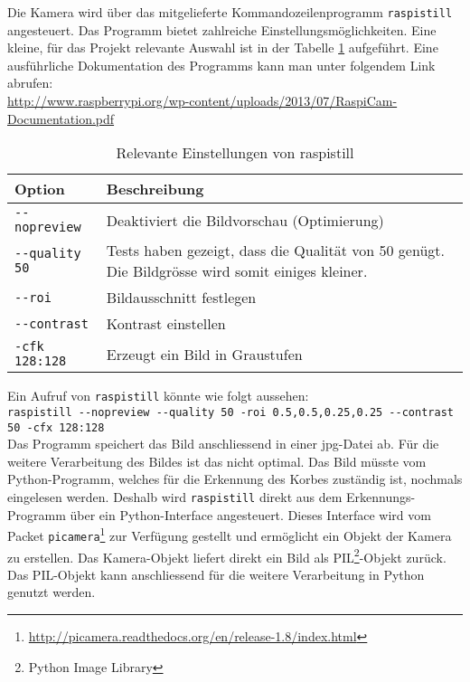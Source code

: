 Die Kamera wird über das mitgelieferte Kommandozeilenprogramm \verb|raspistill| angesteuert. Das Programm bietet zahlreiche Einstellungsmöglichkeiten. Eine kleine, für das Projekt relevante Auswahl ist in der Tabelle \ref{tab:raspistill} aufgeführt. Eine ausführliche Dokumentation des Programms kann man unter folgendem Link abrufen: \\

\href{http://www.raspberrypi.org/wp-content/uploads/2013/07/RaspiCam-Documentation.pdf}{http://www.raspberrypi.org/wp-content/uploads/2013/07/RaspiCam-Documentation.pdf} \\

\begin{table}[h!]
	\renewcommand{\arraystretch}{1.5}
	\begin{tabular}{|l|p{14cm}|}
		\hline Option & Beschreibung \\ 
		\hline \verb|--nopreview| & Deaktiviert die Bildvorschau (Optimierung) \\ 
		\hline  \verb|--quality 50| & Tests haben gezeigt, dass die Qualität von 50 genügt. Die Bildgrösse wird somit einiges kleiner. \\ 
		\hline  \verb|--roi| & Bildausschnitt festlegen \\ 
		\hline  \verb|--contrast| & Kontrast einstellen \\ 
		\hline  \verb|-cfk 128:128| & Erzeugt ein Bild in Graustufen \\ 
		\hline 
	\end{tabular} 
	\caption{Relevante Einstellungen von raspistill}
	\label{tab:raspistill}
\end{table}

Ein Aufruf von \verb|raspistill| könnte wie folgt aussehen: \\

\verb|raspistill --nopreview --quality 50 -roi 0.5,0.5,0.25,0.25 --contrast 50 -cfx 128:128| \\

Das Programm speichert das Bild anschliessend in einer jpg-Datei ab. Für die weitere Verarbeitung des Bildes ist das nicht optimal. Das Bild müsste vom Python-Programm, welches für die Erkennung des Korbes zuständig ist, nochmals eingelesen werden. Deshalb wird \verb|raspistill| direkt aus dem Erkennungs-Programm über ein Python-Interface angesteuert. Dieses Interface wird vom Packet \verb|picamera|\footnote{\href{http://picamera.readthedocs.org/en/release-1.8/index.html}{http://picamera.readthedocs.org/en/release-1.8/index.html}} zur Verfügung gestellt und ermöglicht ein Objekt der Kamera zu erstellen. Das Kamera-Objekt liefert direkt ein Bild als PIL\footnote{Python Image Library}-Objekt zurück. Das PIL-Objekt kann anschliessend für die weitere Verarbeitung in Python genutzt werden.
